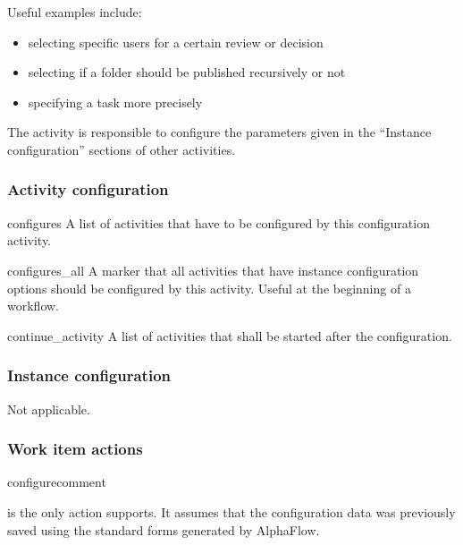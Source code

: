   Useful examples include: 
  
  \begin{itemize}
      \item selecting specific users for a certain review or decision
      \item selecting if a folder should be published recursively or not
      \item specifying a task more precisely
  \end{itemize}

  The  activity is responsible to configure the
  parameters given in the ``Instance configuration'' sections of other
  activities.
  
  \subsubsection{Activity configuration}


    \begin{memberdesc}{configures}
        A list of activities that have to be configured by this
          configuration activity.
    \end{memberdesc}
          
    \begin{memberdesc}{configures\_all} A marker that all activities that have
        instance configuration options should be configured by this activity.
        Useful at the beginning of a workflow.
    \end{memberdesc}

    \begin{memberdesc}{continue\_activity} A list of activities that shall be
        started after the configuration.  
    \end{memberdesc}

  \subsubsection{Instance configuration}

  Not applicable.
    
  \subsubsection{Work item actions} %


    \begin{funcdesc}{configure}{comment}
        
       is the only action  supports.
      It assumes that the configuration data was previously saved using the
      standard forms generated by AlphaFlow.

    \end{funcdesc}

